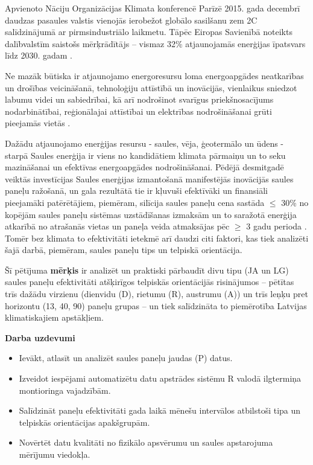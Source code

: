 Apvienoto Nāciju Organizācijas Klimata konferencē Parīzē 2015. gada decembrī daudzas pasaules valstis vienojās ierobežot globālo sasilšanu zem 2\textdegree C salīdzinājumā ar pirmsindustriālo laikmetu.
Tāpēc Eiropas Savienībā noteikts dalībvalstīm saistošs mērķrādītājs  –  vismaz 32\%  atjaunojamās enerģijas īpatsvars līdz 2030. gadam \cite{ES}.

Ne mazāk būtiska ir atjaunojamo energoresursu loma energoapgādes neatkarības un drošības veicināšanā, tehnoloģiju attīstībā un inovācijās, vienlaikus sniedzot labumu videi un sabiedrībai, kā arī nodrošinot svarīgus priekšnosacījums nodarbinātībai, reģionālajai attīstībai un elektrības nodrošināšanai grūti pieejamās vietās \cite{ES}.

Dažādu atjaunojamo enerģijas resursu - saules, vēja, ģeotermālo un ūdens - starpā Saules enerģija ir viens no kandidātiem klimata pārmaiņu un to seku mazināšanai un efektīvas energoapgādes nodrošināšanai. Pēdējā desmitgadē veiktās investīcijas Saules enerģijas izmantošanā manifestējās inovācijās saules paneļu ražošanā, un gala rezultātā tie ir kļuvuši efektīvāki un finansiāli pieejamāki patērētājiem, piemēram, silīcija saules paneļu cena sastāda $\leq$ 30\% no kopējām saules paneļu sistēmas uzstādīšanas izmaksām un to saražotā enerģija atkarībā no atrašanās vietas un paneļa veida atmaksājas pēc $\geq$ 3 gadu perioda \cite{researchOpp}. Tomēr bez klimata to efektivitāti ietekmē arī daudzi citi faktori, kas tiek analizēti šajā darbā, piemēram, saules paneļu tips un telpiskā orientācija.

Šī pētījuma \textbf{mērķis} ir analizēt un praktiski pārbaudīt divu tipu (JA un LG) saules paneļu efektivitāti atšķirīgos telpiskās orientācijās risinājumos -- pētītas trīs dažādu virzienu (dienvidu (D), rietumu (R), austrumu (A)) un trīs leņķu pret horizontu (13\textdegree, 40\textdegree, 90\textdegree) paneļu grupas -- un tiek salīdzināta to piemērotība Latvijas klimatiskajiem apstākļiem.

\textbf{Darba uzdevumi}
\begin{itemize}
\item Ievākt, atlasīt un analizēt saules paneļu jaudas (P) datus.
\item Izveidot iespējami automatizētu datu apstrādes sistēmu R valodā ilgtermiņa montioringa vajadzībām.
\item Salīdzināt paneļu efektivitāti gada laikā mēnešu intervālos atbilstoši tipa un telpiskās orientācijas apakšgrupām.
\item Novērtēt datu kvalitāti no fizikālo apsvērumu un saules apstarojuma mērījumu viedokļa.
\end{itemize}


